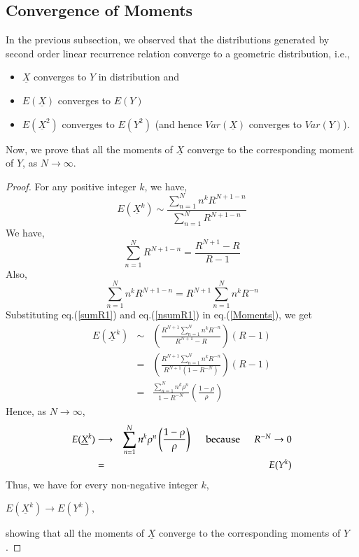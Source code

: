 \begin{multicols}{2}
\section{Convergence of Moments}\label{section-13}
In the previous subsection, we observed that the distributions generated by second order linear recurrence relation converge to a geometric distribution, i.e., 
\begin{itemize}
\item $\underline{X}$ converges to $Y$ in distribution and 
\item $E(\underline{X})$ converges to $E(Y)$  
\item $E(\underline{X}^2)$ converges to $E(Y^2)$ (and hence $Var(\underline{X})$ converges to $Var(Y)$).
\end{itemize}
Now, we prove that all the moments of $\underline{X}$ converge to the corresponding moment of $Y$, as $N \rightarrow \infty$.
\begin{proof}\renewcommand{\qedsymbol}{} 
For any positive integer $k$, we have,
\begin{equation}
E(\underline{X}^k)  \sim  \displaystyle{\frac{\displaystyle{\sum_{n=1}^{N}}n^k R^{N+1-n}}{\displaystyle{\sum_{n=1}^{N}}R^{N+1-n}}}\label{eq-13.1}
\end{equation}
We have,
\begin{equation}
\displaystyle{\sum_{n=1}^{N}}R^{N+1-n} = \displaystyle{\frac{R^{N+1}-R}{R-1}}\label{eq-13.2}
\end{equation}
Also,
\begin{equation}
\displaystyle{\sum_{n=1}^{N}}n^kR^{N+1-n} = R^{N+1}\displaystyle{\sum_{n=1}^{N}n^kR^{-n}}\label{eq-13.3}
\end{equation}
Substituting eq.(\ref{sumR1}) and eq.(\ref{nsumR1}) in eq.(\ref{Moments}), we get
\begin{eqnarray}
E(\underline{X}^k) &\sim& \left(\displaystyle{\frac{R^{N+1}\displaystyle{\sum_{n=1}^{N}n^kR^{-n}}}{R^{N+1}-R}}\right)(R-1)\nonumber\\
&=& \left(\displaystyle{\frac{R^{N+1}\displaystyle{\sum_{n=1}^{N}n^kR^{-n}}}{R^{N+1}(1-R^{-N})}}\right)(R-1)\nonumber\\
&=& \displaystyle{\frac{\displaystyle{\sum_{n=1}^{N}}n^k\rho^{n}}{1-R^{-N}}}\left(\frac{1-\rho}{\rho}\right)\nonumber
\end{eqnarray}
Hence, as $N \rightarrow \infty$,
\begin{eqnarray}
E(\underline{X}^k) &\longrightarrow& \displaystyle{\sum_{n=1}^{N}n^k\rho^{n}}\left(\frac{1-\rho}{\rho}\right) \hspace{0.2in} \textup{because}\hspace{0.2in} R^{-N}\rightarrow 0\nonumber\\
&=& E(Y^k)\nonumber
\end{eqnarray}
Thus, we have for every non-negative integer $k$,
\begin{center}
 $E(\underline{X}^k) \longrightarrow E(Y^k),$ 
\end{center}
showing that all the moments of $\underline{X}$ converge to the corresponding moments of $Y$. 
\end{proof}


\end{multicols}
